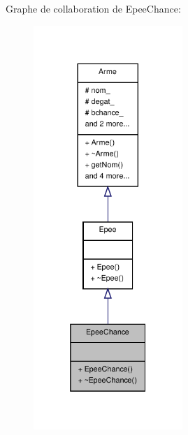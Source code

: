 Graphe de collaboration de Epee\-Chance\-:
\nopagebreak
\begin{figure}[H]
\begin{center}
\leavevmode
\includegraphics[width=160pt]{class_epee_chance__coll__graph}
\end{center}
\end{figure}
